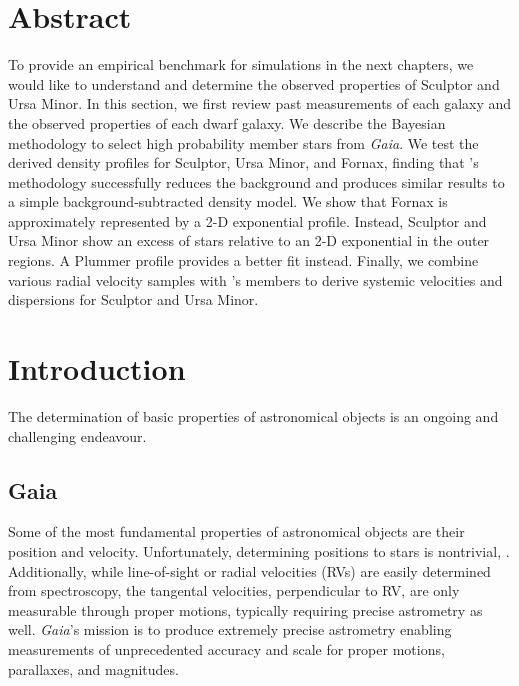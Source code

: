 \section{Abstract}\label{abstract}

To provide an empirical benchmark for simulations in the next chapters,
we would like to understand and determine the observed properties of
Sculptor and Ursa Minor. In this section, we first review past
measurements of each galaxy and the observed properties of each dwarf
galaxy. We describe the \citet{jensen+2024} Bayesian methodology to
select high probability member stars from \emph{Gaia}. We test the
derived density profiles for Sculptor, Ursa Minor, and Fornax, finding
that \citet{jensen+2024}'s methodology successfully reduces the
background and produces similar results to a simple
background-subtracted density model. We show that Fornax is
approximately represented by a 2-D exponential profile. Instead,
Sculptor and Ursa Minor show an excess of stars relative to an 2-D
exponential in the outer regions. A Plummer profile provides a better
fit instead. Finally, we combine various radial velocity samples with
\citet{jensen+2024}'s members to derive systemic velocities and
dispersions for Sculptor and Ursa Minor.

\section{Introduction}\label{introduction}

The determination of basic properties of astronomical objects is an
ongoing and challenging endeavour.

\subsection{Gaia}\label{gaia}

Some of the most fundamental properties of astronomical objects are
their position and velocity. Unfortunately, determining positions to
stars is nontrivial, . Additionally, while line-of-sight or radial
velocities (RVs) are easily determined from spectroscopy, the tangental
velocities, perpendicular to RV, are only measurable through proper
motions, typically requiring precise astrometry as well. \emph{Gaia}'s
mission is to produce extremely precise astrometry enabling measurements
of unprecedented accuracy and scale for proper motions, parallaxes, and
magnitudes.

